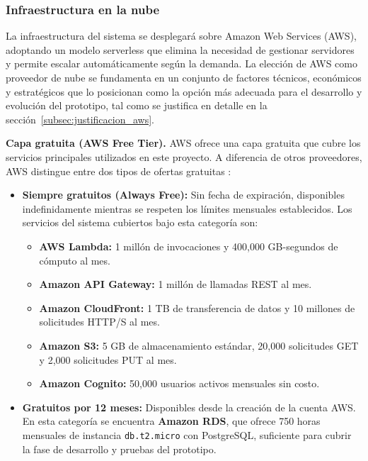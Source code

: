 \newpage
\subsubsection{Infraestructura en la nube}
\label{subsec:infraestructura}

La infraestructura del sistema se desplegará sobre Amazon Web Services
(AWS), adoptando un modelo serverless que elimina la necesidad de
gestionar servidores y permite escalar automáticamente según la demanda.
La elección de AWS como proveedor de nube se fundamenta en un conjunto
de factores técnicos, económicos y estratégicos que lo posicionan como
la opción más adecuada para el desarrollo y evolución del prototipo,
tal como se justifica en detalle en la sección~\ref{subsec:justificacion_aws}.

\textbf{Capa gratuita (AWS Free Tier).} AWS ofrece una capa gratuita
que cubre los servicios principales utilizados en este proyecto. A
diferencia de otros proveedores, AWS distingue entre dos tipos de
ofertas gratuitas \cite{aws_free_tier}:

\begin{itemize}
    \item \textbf{Siempre gratuitos (Always Free):} Sin fecha de
    expiración, disponibles indefinidamente mientras se respeten los
    límites mensuales establecidos. Los servicios del sistema cubiertos
    bajo esta categoría son:
    \begin{itemize}
        \item \textbf{AWS Lambda:} 1 millón de invocaciones y 400,000
        GB-segundos de cómputo al mes.
        \item \textbf{Amazon API Gateway:} 1 millón de llamadas REST
        al mes.
        \item \textbf{Amazon CloudFront:} 1 TB de transferencia de
        datos y 10 millones de solicitudes HTTP/S al mes.
        \item \textbf{Amazon S3:} 5 GB de almacenamiento estándar,
        20,000 solicitudes GET y 2,000 solicitudes PUT al mes.
        \item \textbf{Amazon Cognito:} 50,000 usuarios activos mensuales
        sin costo.
    \end{itemize}
    \item \textbf{Gratuitos por 12 meses:} Disponibles desde la
    creación de la cuenta AWS. En esta categoría se encuentra
    \textbf{Amazon RDS}, que ofrece 750 horas mensuales de instancia
    \texttt{db.t2.micro} con PostgreSQL, suficiente para cubrir la
    fase de desarrollo y pruebas del prototipo.
\end{itemize}

